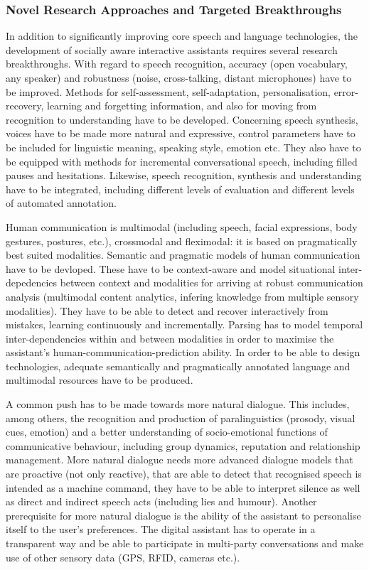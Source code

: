 \documentclass[10pt, plain]{../../metanetpaper}
\begin{document}
\begin{multicols}{2}
\subsubsection{Novel Research Approaches and Targeted Breakthroughs}
\label{sec:novel-rese-appr-pt3}

In addition to significantly improving core speech and language technologies, the development of socially aware interactive assistants requires several research breakthroughs. With regard to speech recognition, accuracy (open vocabulary, any speaker) and robustness (noise, cross-talking, distant microphones) have to be improved. Methods for self-assessment, self-adaptation, personalisation, error-recovery, learning and forgetting information, and also for moving from recognition to understanding have to be developed. Concerning speech synthesis, voices have to be made more natural and expressive, control parameters have to be included for linguistic meaning, speaking style, emotion etc. They also have to be equipped with methods for incremental conversational speech, including filled pauses and hesitations. Likewise, speech recognition, synthesis and understanding have to be integrated, including different levels of evaluation and different levels of automated annotation.

Human communication is multimodal (including speech, facial expressions, body gestures, postures, etc.), crossmodal and fleximodal: it is based on pragmatically best suited modalities. Semantic and pragmatic models of human communication have to be devloped. These have to be context-aware and model situational inter-depedencies between context and modalities for arriving at robust communication analysis (multimodal content analytics, infering knowledge from multiple sensory modalities). They have to be able to detect and recover interactively from mistakes, learning continuously and incrementally. Parsing has to model temporal inter-dependencies within and between modalities in order to maximise the assistant's human-communication-prediction ability. In order to be able to design technologies, adequate semantically and pragmatically annotated language and multimodal resources have to be produced.

A common push has to be made towards more natural dialogue. This includes, among others, the recognition and production of paralinguistics (prosody, visual cues, emotion) and a better understanding of socio-emotional functions of communicative behaviour, including group dynamics, reputation and relationship management. More natural dialogue needs more advanced dialogue models that are proactive (not only reactive), that are able to detect that recognised speech is intended as a machine command, they have to be able to interpret silence as well as direct and indirect speech acts (including lies and humour). Another prerequisite for more natural dialogue is the ability of the assistant to personalise itself to the user's preferences. The digital assistant has to operate in a transparent way and be able to participate in multi-party conversations and make use of other sensory data (GPS, RFID, cameras etc.).


\end{multicols}
\end{document}
